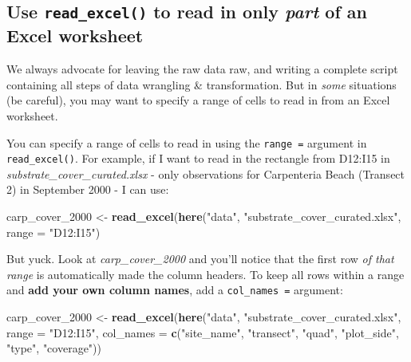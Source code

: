\documentclass[]{book}
\newenvironment{Shaded}{\begin{snugshade}}{\end{snugshade}}
\newcommand{\DataTypeTok}[1]{\textcolor[rgb]{0.13,0.29,0.53}{#1}}
\newcommand{\DecValTok}[1]{\textcolor[rgb]{0.00,0.00,0.81}{#1}}
\newcommand{\KeywordTok}[1]{\textcolor[rgb]{0.13,0.29,0.53}{\textbf{#1}}}
\newcommand{\NormalTok}[1]{#1}
\newcommand{\StringTok}[1]{\textcolor[rgb]{0.31,0.60,0.02}{#1}}
\begin{document}
\hypertarget{use-read_excel-to-read-in-only-part-of-an-excel-worksheet}{%
\subsection{\texorpdfstring{Use \texttt{read\_excel()} to read in only \emph{part} of an Excel worksheet}{Use read\_excel() to read in only part of an Excel worksheet}}\label{use-read_excel-to-read-in-only-part-of-an-excel-worksheet}}

We always advocate for leaving the raw data raw, and writing a complete script containing all steps of data wrangling \& transformation. But in \emph{some} situations (be careful), you may want to specify a range of cells to read in from an Excel worksheet.

You can specify a range of cells to read in using the \texttt{range\ =} argument in \texttt{read\_excel()}. For example, if I want to read in the rectangle from D12:I15 in \emph{substrate\_cover\_curated.xlsx} - only observations for Carpenteria Beach (Transect 2) in September 2000 - I can use:

\begin{Shaded}
\begin{Highlighting}[]
\NormalTok{carp_cover_}\DecValTok{2000}\NormalTok{ <-}\StringTok{ }\KeywordTok{read_excel}\NormalTok{(}\KeywordTok{here}\NormalTok{(}\StringTok{"data"}\NormalTok{, }\StringTok{"substrate_cover_curated.xlsx"}\NormalTok{, }\DataTypeTok{range =} \StringTok{"D12:I15"}\NormalTok{)}
\end{Highlighting}
\end{Shaded}

But yuck. Look at \emph{carp\_cover\_2000} and you'll notice that the first row \emph{of that range} is automatically made the column headers. To keep all rows within a range and \textbf{add your own column names}, add a \texttt{col\_names\ =} argument:

\begin{Shaded}
\begin{Highlighting}[]
\NormalTok{carp_cover_}\DecValTok{2000}\NormalTok{ <-}\StringTok{ }\KeywordTok{read_excel}\NormalTok{(}\KeywordTok{here}\NormalTok{(}\StringTok{"data"}\NormalTok{, }\StringTok{"substrate_cover_curated.xlsx"}\NormalTok{, }\DataTypeTok{range =} \StringTok{"D12:I15"}\NormalTok{, }\DataTypeTok{col_names =} \KeywordTok{c}\NormalTok{(}\StringTok{"site_name"}\NormalTok{, }\StringTok{"transect"}\NormalTok{, }\StringTok{"quad"}\NormalTok{, }\StringTok{"plot_side"}\NormalTok{, }\StringTok{"type"}\NormalTok{, }\StringTok{"coverage"}\NormalTok{))}
\end{Highlighting}
\end{Shaded}
\end{document}
